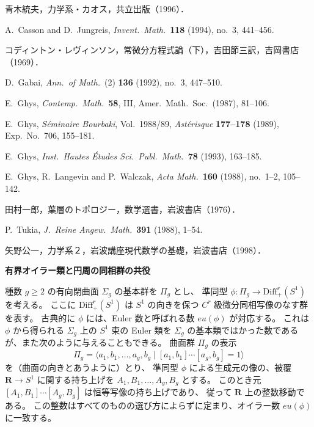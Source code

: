 \documentclass[uplatex,dvipdfmx]{jlreq}
\newcommand{\Diff}{\mathrm{Diff}^r_+(S^1)}
\newcommand{\R}{\mathbf{R}}
\begin{document}
\begin{enumerate}[{[1]}]
  \setlength{\itemsep}{3pt}
  \item 青木統夫，力学系・カオス，共立出版（1996）．
  \item A.~Casson and D.~Jungreis,
        \textit{Invent.\ Math.}\ \textbf{118} (1994), no.~3, 441--456.
  \item コディントン・レヴィンソン，常微分方程式論（下），吉田節三訳，吉岡書店（1969）．
  \item D.~Gabai,
        \textit{Ann.\ of Math.}\ (2) \textbf{136} (1992), no.~3, 447--510.
  \item E.~Ghys,
        \textit{Contemp.\ Math.}\ \textbf{58}, III, Amer.\ Math.\ Soc.\ (1987), 81--106.
  \item E.~Ghys,
        \textit{Séminaire Bourbaki}, Vol.\ 1988/89,
        \textit{Astérisque} \textbf{177--178} (1989), Exp.\ No.~706, 155--181.
  \item E.~Ghys,
        \textit{Inst.\ Hautes Études Sci.\ Publ.\ Math.}\ \textbf{78} (1993), 163--185.
  \item E.~Ghys, R.~Langevin and P.~Walczak,
        \textit{Acta Math.}\ \textbf{160} (1988), no.~1--2, 105--142.
  \item 田村一郎，葉層のトポロジー，数学選書，岩波書店（1976）．
  \item P.~Tukia,
        \textit{J.\ Reine Angew.\ Math.}\ \textbf{391} (1988), 1--54.
  \item 矢野公一，力学系２，岩波講座現代数学の基礎，岩波書店（1998）．
\end{enumerate}

\newpage

\begin{center}
{\large\bfseries 有界オイラー類と円周の同相群の共役}

\hspace*{\fill}{\large\bfseries 松元重則（日大理工）}
\end{center}

\medskip

種数 $g \geq 2$ の有向閉曲面 $\Sigma_g$ の基本群を $\Pi_g$ とし、
準同型 $\phi : \Pi_g \to \Diff$ を考える。
ここに $\Diff$ は $S^1$ の向きを保つ $C^r$ 級微分同相写像のなす群を表す。
古典的に $\phi$ には、Euler 数と呼ばれる数 $eu(\phi)$ が対応する。
これは $\phi$ から得られる $\Sigma_g$ 上の $S^1$ 束の Euler 類を
$\Sigma_g$ の基本類ではかった数であるが、また次のように与えることもできる。
曲面群 $\Pi_g$ の表示
\[
  \Pi_g = \langle a_1, b_1, \ldots, a_g, b_g \mid [a_1,b_1] \cdots [a_g,b_g] = 1 \rangle
\]
を（曲面の向きとあうように）とり、
準同型 $\phi$ による生成元の像の、被覆 $\R \to S^1$ に関する持ち上げを
$A_1, B_1, \ldots, A_g, B_g$ とする。
このとき元 $[A_1, B_1] \cdots [A_g, B_g]$ は恒等写像の持ち上げであり、
従って $\R$ 上の整数移動である。
この整数はすべてのものの選び方によらずに定まり、オイラー数 $eu(\phi)$ に一致する。
\end{document}
